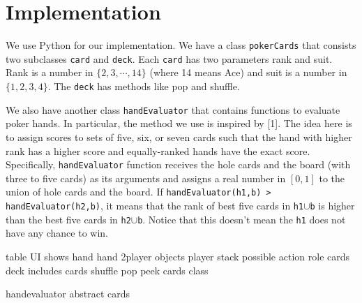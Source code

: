  
\section{Implementation}
We use Python for our implementation. We have a class {\tt pokerCards} that consists
two subclasses {\tt card} and {\tt deck}. Each {\tt card} has two parameters rank and suit.
Rank is a number in $\{2,3,\cdots,14\}$ (where 14 means Ace) and suit is a number in 
$\{1,2,3,4\}$. The {\tt deck} has methods like pop and shuffle.

We also have another class {\tt handEvaluator} that contains functions to evaluate poker hands.
In particular, the method we use is inspired by [1]. The idea here is to assign scores to sets of
five, six, or seven cards such that the hand with higher rank has a higher score and equally-ranked
hands have the exact score. Specifically, {\tt handEvaluator} function receives the hole cards and  
the board (with three to five cards) as its arguments and assigns a real number in $[0,1]$
to the union of hole cards and the board. If {\tt handEvaluator(h1,b) > handEvaluator(h2,b)},
it means that the rank of best five cards in {\tt h1$\cup$b} is higher than the best five cards
in {\tt h2$\cup$b}. Notice that this doesn't mean the {\tt h1} does not have any chance to win.



table UI shows hand
hand 2player objects 
player stack possible action role cards
deck includes cards shuffle pop peek
cards class

handevaluator
abstract cards